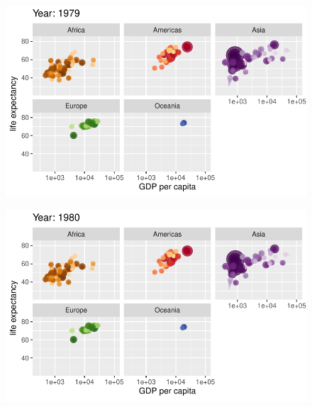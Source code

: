 \documentclass[
  letterpaper,
  DIV=11,
  numbers=noendperiod]{scrartcl}
\begin{document}
\begin{figure}[H]

{\centering \includegraphics{class05_files/figure-pdf/unnamed-chunk-24-50.pdf}

}

\end{figure}

\begin{figure}[H]

{\centering \includegraphics{class05_files/figure-pdf/unnamed-chunk-24-51.pdf}

}

\end{figure}
\end{document}
